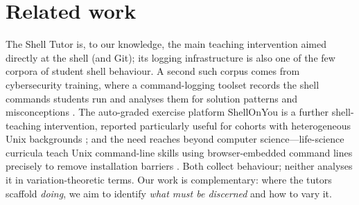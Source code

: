 \mode*
\section{Related work}
\label{sec:related}

The Shell Tutor \autocite{Winder2024ShellTutor} is, to our knowledge, the
main teaching intervention aimed directly at the shell (and Git); its
logging infrastructure is also one of the few corpora of student shell
behaviour.
A second such corpus comes from cybersecurity training, where a
command-logging toolset records the shell commands students run and analyses
them for solution patterns and misconceptions
\autocite{Svabensky2021ShellCommands}.
The auto-graded exercise platform ShellOnYou is a further shell-teaching
intervention, reported particularly useful for cohorts with heterogeneous
Unix backgrounds \autocite{Berry2022ShellOnYou}; and the need reaches
beyond computer science---life-science curricula teach Unix command-line
skills using browser-embedded command lines precisely to remove
installation barriers \autocite{Khamvongsa2026UnixBiologists}.
Both collect behaviour; neither analyses it in variation-theoretic terms.
Our work is complementary: where the tutors scaffold \emph{doing}, we aim
to identify \emph{what must be discerned} and how to vary it.

